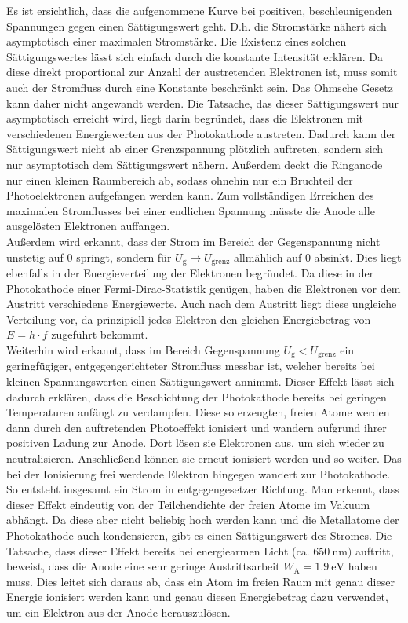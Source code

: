 Es ist ersichtlich, dass die aufgenommene Kurve bei positiven, beschleunigenden Spannungen 
gegen einen Sättigungswert geht. D.h. die Stromstärke nähert sich asymptotisch einer 
maximalen Stromstärke. Die Existenz eines solchen Sättigungswertes lässt sich einfach 
durch die konstante Intensität erklären. Da diese direkt proportional zur Anzahl der 
austretenden Elektronen ist, muss somit auch der Stromfluss durch eine Konstante 
beschränkt sein. Das Ohmsche Gesetz kann daher nicht angewandt werden. Die Tatsache, 
das dieser Sättigungswert nur asymptotisch erreicht wird, liegt darin begründet, dass 
die Elektronen mit verschiedenen Energiewerten aus der Photokathode austreten. Dadurch 
kann der Sättigungswert nicht ab einer Grenzspannung plötzlich auftreten, sondern sich 
nur asymptotisch dem Sättigungswert nähern. Außerdem deckt die Ringanode nur einen kleinen
Raumbereich ab, sodass ohnehin nur ein Bruchteil der Photoelektronen aufgefangen werden kann. 
Zum vollständigen Erreichen des maximalen Stromflusses bei einer endlichen Spannung müsste 
die Anode alle ausgelösten Elektronen auffangen. \\
Außerdem wird erkannt, dass der Strom im Bereich der Gegenspannung nicht unstetig auf 0 
springt, sondern für $U_\text{g}\rightarrow U_\text{grenz}$ allmählich auf 0 absinkt. Dies liegt ebenfalls 
in der Energieverteilung der Elektronen begründet. Da diese in der Photokathode einer 
Fermi-Dirac-Statistik genügen, haben die Elektronen vor dem Austritt verschiedene Energiewerte. 
Auch nach dem Austritt liegt diese ungleiche Verteilung vor, da prinzipiell jedes Elektron 
den gleichen Energiebetrag von $E=h\cdot f$ zugeführt bekommt.\\
Weiterhin wird erkannt, dass im Bereich Gegenspannung $U_\text{g} < U_\text{grenz}$ ein geringfügiger, 
entgegengerichteter Stromfluss messbar ist, welcher bereits bei kleinen Spannungswerten 
einen Sättigungswert annimmt. Dieser Effekt lässt sich dadurch erklären, dass die 
Beschichtung der Photokathode bereits bei geringen Temperaturen anfängt zu verdampfen. 
Diese so erzeugten, freien Atome werden dann durch den auftretenden Photoeffekt ionisiert
und wandern aufgrund ihrer positiven Ladung zur Anode. Dort lösen sie Elektronen aus, um sich 
wieder zu neutralisieren. Anschließend können sie erneut ionisiert werden und so weiter. Das bei 
der Ionisierung frei werdende Elektron hingegen wandert zur Photokathode. So entsteht insgesamt 
ein Strom in entgegengesetzer Richtung. Man erkennt, dass dieser Effekt eindeutig von der 
Teilchendichte der freien Atome im Vakuum abhängt. Da diese aber nicht beliebig hoch werden kann und 
die Metallatome der Photokathode auch kondensieren, gibt es einen Sättigungswert des Stromes. Die 
Tatsache, dass dieser Effekt bereits bei energiearmen Licht (ca. $\SI{650}{\nano\meter})$ auftritt, 
beweist, dass die Anode eine sehr geringe Austrittsarbeit $W_\text{A} = \SI{1.9}{\eV}$ haben muss. 
Dies leitet sich daraus ab, dass ein Atom im freien Raum mit genau dieser Energie ionisiert werden 
kann und genau diesen Energiebetrag dazu verwendet, um ein Elektron aus der Anode herauszulösen. 